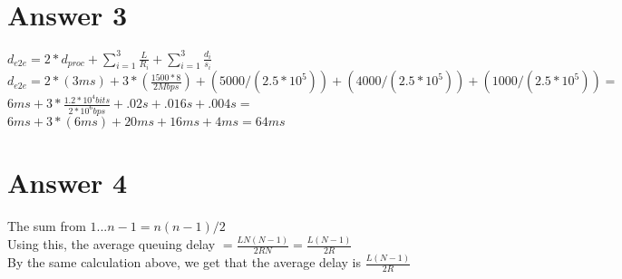 \documentclass[11pt]{article}
\theoremstyle{definition}
\begin{document}
\section*{Answer 3}
$d_{e2e} = 2*d_{proc} + \sum_{i=1}^3 \frac{L}{R_i} + \sum_{i=1}^3 \frac{d_i}{s_i}$\\
$d_{e2e} = 2*(3ms) + 3*(\frac{1500 * 8}{2Mbps}) + (5000/(2.5*10^5)) + (4000/(2.5*10^5)) + (1000/(2.5*10^5)) = $\\
$6ms + 3*\frac{1.2*10^4 bits}{2 * 10^6 bps} + .02s + .016s + .004s =$\\
$6ms + 3*(6ms) + 20ms + 16ms + 4ms = 64ms$

\section*{Answer 4}
The sum from $1...n-1 = n(n-1)/2$\\
Using this, the average queuing delay $= \frac{LN(N-1)}{2RN} = \frac{L(N-1)}{2R}$\\
\newline
By the same calculation above, we get that the average delay is $\frac{L(N-1)}{2R}$
\end{document}
